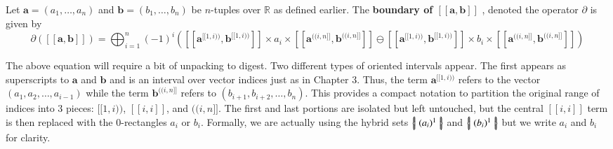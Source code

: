 \begin{definition}
	Let $\boldsymbol{a} = (a_1, \ldots, a_n)$ and $\boldsymbol{b} = (b_1, \ldots, b_n)$ be $n$-tuples over $\mathbb{R}$ as defined earlier. 
	The \textbf{boundary of $ \boldsymbol{[\![ a,b ]\!]} $ }, denoted the operator $\partial$ is given by
	\begin{equation*}
		\partial \left( [\![ \boldsymbol{a}, \boldsymbol{b} ]\!] \right) 
		= \bigoplus_{i=1}^n (-1)^i 
			\left(	
			[\![\boldsymbol{a}^{[\![1,i)\!)}, \boldsymbol{b}^{[\![1,i)\!)} ]\!]
			\times a_i \times
			[\![\boldsymbol{a}^{(\!(i,n]\!]}, \boldsymbol{b}^{(\!(i,n]\!]} ]\!]
			\ominus
			[\![\boldsymbol{a}^{[\![1,i)\!)}, \boldsymbol{b}^{[\![1,i)\!)} ]\!]
			\times b_i \times
			[\![\boldsymbol{a}^{(\!(i,n]\!]}, \boldsymbol{b}^{(\!(i,n]\!]} ]\!]
			\right)
	\end{equation*}
\end{definition}

The above equation will require a bit of unpacking to digest.
Two different types of oriented intervals appear.
The first appears as superscripts to $\boldsymbol{a}$ and $\boldsymbol{b}$ and is an interval over vector indices just as in Chapter 3.
Thus, the term $\boldsymbol{a}^{[\![1,i)\!)}$ refers to the vector $(a_1, a_2, \ldots, a_{i-1})$ 
while the term $\boldsymbol{b}^{(\!(i,n]\!]}$ refers to $(b_{i+1}, b_{i+2}, \ldots, b_{n})$.
This provides a compact notation to partition the original range of indices into 3 pieces: $[\![ 1,i )\!)$, $[\![i, i]\!]$, and $(\!(i, n]\!]$.
The first and last portions are isolated but left untouched, 
but the central $[\![i,i]\!]$ term is then replaced with the 0-rectangles $a_i$ or $b_i$.
Formally, we are actually using the hybrid sets $\left\{ \! \left| \; (a_i)^1 \; \right| \! \right\}$ and $\left\{ \! \left| \; (b_i)^1 \; \right| \! \right\}$ but we write $a_i$ and $b_i$ for clarity.

